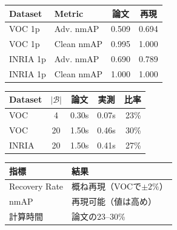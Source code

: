 \begin{table}[htbp]
\centering
\begin{tabular}{llcc}
\toprule
Dataset & Metric & 論文 & 再現 \\
\midrule
VOC 1p & Adv. nmAP & 0.509 & 0.694 \\
VOC 1p & Clean nmAP & 0.995 & 1.000 \\
INRIA 1p & Adv. nmAP & 0.690 & 0.789 \\
INRIA 1p & Clean nmAP & 1.000 & 1.000 \\
\bottomrule
\end{tabular}
\end{table}

\begin{table}[htbp]
\centering
\begin{tabular}{lcccr}
\toprule
Dataset & $|\mathcal{B}|$ & 論文 & 実測 & 比率 \\
\midrule
VOC & 4 & 0.30s & 0.07s & 23\% \\
VOC & 20 & 1.50s & 0.46s & 30\% \\
INRIA & 20 & 1.50s & 0.41s & 27\% \\
\bottomrule
\end{tabular}
\end{table}

\begin{table}[htbp]
\centering
\begin{tabular}{ll}
\toprule
指標 & 結果 \\
\midrule
Recovery Rate & 概ね再現（VOCで$\pm 2\%$） \\
nmAP & 再現可能（値は高め） \\
計算時間 & 論文の23--30\% \\
\bottomrule
\end{tabular}
\end{table}
